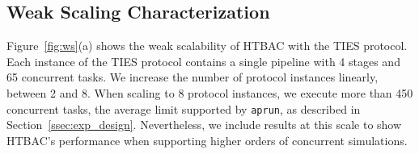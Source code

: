 

\subsection{Weak Scaling Characterization}


Figure~\ref{fig:ws}(a) shows the weak scalability of HTBAC with the TIES
protocol. Each instance of the TIES protocol contains a single pipeline with
4 stages and 65 concurrent tasks. We increase the number of protocol
instances linearly, between 2 and 8. When scaling to 8 protocol instances, we
execute more than 450 concurrent tasks, the average limit supported by
\texttt{aprun}, as described in Section~\ref{ssec:exp_design}. Nevertheless,
we include results at this scale to show HTBAC's performance when supporting
higher orders of concurrent simulations.

